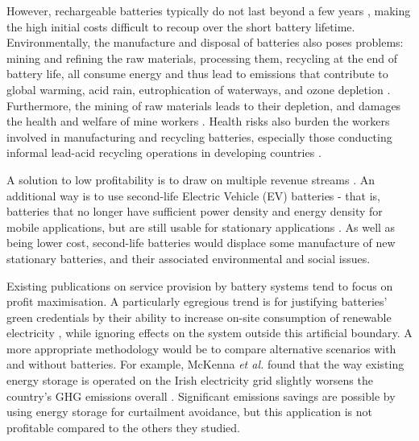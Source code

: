 \documentclass[report_18month.tex]{subfiles}
\begin{document}
However, rechargeable batteries typically do not last beyond a few years \cite{luo2015overview}, making the high initial costs difficult to recoup over the short battery lifetime. \cite{zhang2017sweden,abdulla2017aus,nottrott2013pvbatt,stadler2009expensiveco2} Environmentally, the manufacture and disposal of batteries also poses problems: mining and refining the raw materials, processing them, recycling at the end of battery life, all consume energy and thus lead to emissions that contribute to global warming, acid rain, eutrophication of waterways, and ozone depletion \cite{romare2017life,peters2017aqueous}. Furthermore, the mining of raw materials leads to their depletion, and damages the health and welfare of mine workers \cite{mcmanus2012lithium}. Health risks also burden the workers involved in manufacturing and recycling batteries, especially those conducting informal lead-acid recycling operations in developing countries \cite{haefliger2009leadpoison,gottesfeld2011lead}.

A solution to low profitability is to draw on multiple revenue streams \cite{tsagkou2017stack,moreno2015milp}. An additional way is to use second-life Electric Vehicle (EV) batteries - that is, batteries that no longer have sufficient power density and energy density for mobile applications, but are still usable for stationary applications \cite{gaines2014evbatt,jiao2016evbiz}. As well as being lower cost, second-life batteries would displace some manufacture of new stationary batteries, and their associated environmental and social issues.

Existing publications on service provision by battery systems tend to focus on profit maximisation. A particularly egregious trend is for justifying batteries' green credentials by their ability to increase on-site consumption of renewable electricity \cite{zhang2017sweden,hoppmann2014selfcons,weniger2013sizing}, while ignoring effects on the system outside this artificial boundary. A more appropriate methodology would be to compare alternative scenarios with and without batteries. For example, McKenna \emph{et al.} found that the way existing energy storage is operated on the Irish electricity grid slightly worsens the country's GHG emissions overall \cite{mckenna2017eir}. Significant emissions savings are possible by using energy storage for curtailment avoidance, but this application is not profitable compared to the others they studied.
\end{document}
